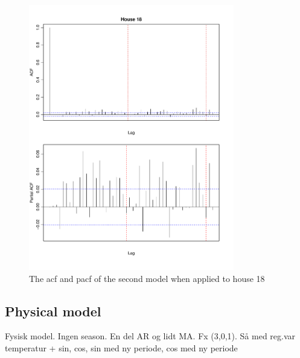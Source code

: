 \begin{figure}
    \centering
    \includegraphics[width=0.8\textwidth]{../../../figures/arimax/ACF_18_short.pdf}
    \caption{The acf and pacf of the second model when applied to house 18}
    \label{fig:Model2_acf_18}
\end{figure}    







\subsection{Physical model}



Fysisk model. Ingen season. En del AR og lidt MA. Fx (3,0,1). Så med reg.var temperatur + sin, cos, sin med ny periode, cos med ny periode



